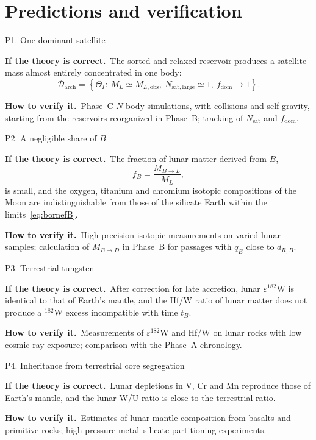 \documentclass[11pt,a4paper,openany]{report}
\newcommand{\sila}{\par\noindent\textbf{If the theory is correct.}\ }
\newcommand{\verif}{\par\smallskip\noindent\textbf{How to verify it.}\ }
\begin{document}
\chapter{Predictions and verification}
\label{ch:predictions}
\label{sec:signatures}

\begin{prediction}{P1. One dominant satellite}
\sila The sorted and relaxed reservoir produces a satellite mass almost entirely concentrated in one
body:
\begin{equation}
\mathcal{D}_{\mathrm{arch}}=\left\{\Theta_I:\ M_L\simeq M_{L,\mathrm{obs}},\
N_{\mathrm{sat,large}}\simeq1,\ f_{\mathrm{dom}}\to1\right\}.
\label{eq:Darch}
\end{equation}
\verif Phase~C $N$-body simulations, with collisions and self-gravity, starting from the reservoirs
reorganized in Phase~B; tracking of $N_{\mathrm{sat}}$ and $f_{\mathrm{dom}}$.
\end{prediction}

\begin{prediction}{P2. A negligible share of \texorpdfstring{$B$}{B}}
\sila The fraction of lunar matter derived from $B$,
\begin{equation}
f_B=\frac{M_{B\to L}}{M_L},
\label{eq:fB}
\end{equation}
is small, and the oxygen, titanium and chromium isotopic compositions of the Moon are
indistinguishable from those of the silicate Earth within the limits~\eqref{eq:bornefB}.
\verif High-precision isotopic measurements on varied lunar samples; calculation of $M_{B\to D}$ in
Phase~B for passages with $q_B$ close to $d_{R,B}$.
\end{prediction}

\begin{prediction}{P3. Terrestrial tungsten}
\sila After correction for late accretion, lunar $\varepsilon^{182}$W is identical to that of Earth's
mantle, and the Hf/W ratio of lunar matter does not produce a $^{182}$W excess incompatible with
time $t_B$.
\verif Measurements of $\varepsilon^{182}$W and Hf/W on lunar rocks with low cosmic-ray exposure;
comparison with the Phase~A chronology.
\end{prediction}

\begin{prediction}{P4. Inheritance from terrestrial core segregation}
\sila Lunar depletions in V, Cr and Mn reproduce those of Earth's mantle, and the lunar W/U ratio is
close to the terrestrial ratio.
\verif Estimates of lunar-mantle composition from basalts and primitive rocks; high-pressure
metal--silicate partitioning experiments.
\end{prediction}
\end{document}
